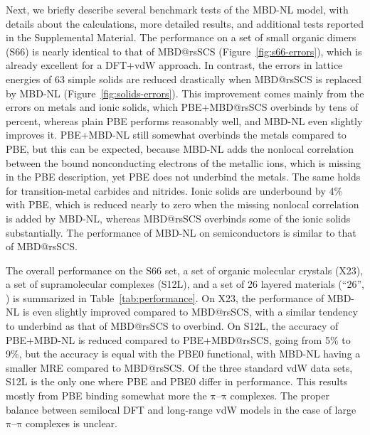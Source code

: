 Next, we briefly describe several benchmark tests of the MBD-NL model, with details about the calculations, more detailed results, and additional tests reported in the Supplemental Material.
The performance on a set of small organic dimers (S66) is nearly identical to that of MBD@rsSCS (Figure~\ref{fig:s66-errors}), which is already excellent for a DFT+vdW approach.
In contrast, the errors in lattice energies of 63 simple solids are reduced drastically when MBD@rsSCS is replaced by MBD-NL (Figure~\ref{fig:solids-errors}).
This improvement comes mainly from the errors on metals and ionic solids, which PBE+MBD@rsSCS overbinds by tens of percent, whereas plain PBE performs reasonably well, and MBD-NL even slightly improves it.
PBE+MBD-NL still somewhat overbinds the metals compared to PBE, but this can be expected, because MBD-NL adds the nonlocal correlation between the bound nonconducting electrons of the metallic ions, which is missing in the PBE description, yet PBE does not underbind the metals.
The same holds for transition-metal carbides and nitrides.
Ionic solids are underbound by 4\% with PBE, which is reduced nearly to zero when the missing nonlocal correlation is added by MBD-NL, whereas MBD@rsSCS overbinds some of the ionic solids substantially.
The performance of MBD-NL on semiconductors is similar to that of MBD@rsSCS\@.

The overall performance on the S66 set, a set of organic molecular crystals (X23), a set of supramolecular complexes (S12L), and a set of 26 layered materials (``26'', \citet{BjorkmanPRB12}) is summarized in Table~\ref{tab:performance}.
On X23, the performance of MBD-NL is even slightly improved compared to MBD@rsSCS, with a similar tendency to underbind as that of MBD@rsSCS to overbind.
On S12L, the accuracy of PBE+MBD-NL is reduced compared to PBE+MBD@rsSCS, going from 5\% to 9\%, but the accuracy is equal with the PBE0 functional, with MBD-NL having a smaller MRE compared to MBD@rsSCS\@.
Of the three standard vdW data sets, S12L is the only one where PBE and PBE0 differ in performance.
This results mostly from PBE binding somewhat more the $\mathrm\pi$--$\mathrm\pi$ complexes.
The proper balance between semilocal DFT and long-range vdW models in the case of large $\mathrm\pi$--$\mathrm\pi$ complexes is unclear.

